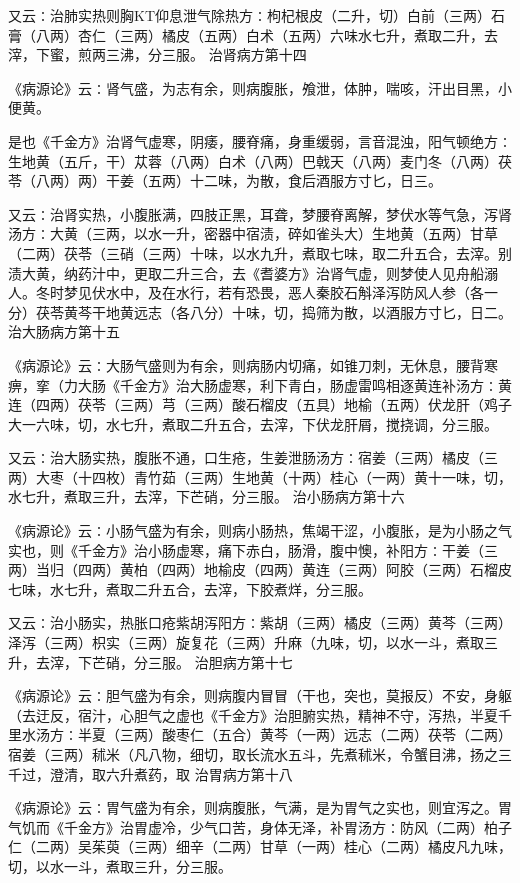 \documentclass[a4paper,12pt,UTF8,twoside]{ctexbook}
\begin{document}
又云∶治肺实热则胸KT仰息泄气除热方∶枸杞根皮（二升，切）白前（三两）石膏（八两）杏仁（三两）橘皮（五两）白术（五两）六味水七升，煮取二升，去滓，下蜜，煎两三沸，分三服。
治肾病方第十四

《病源论》云∶肾气盛，为志有余，则病腹胀，飧泄，体肿，喘咳，汗出目黑，小便黄。

是也《千金方》治肾气虚寒，阴痿，腰脊痛，身重缓弱，言音混浊，阳气顿绝方∶生地黄（五斤，干）苁蓉（八两）白术（八两）巴戟天（八两）麦门冬（八两）茯苓（八两）两）干姜（五两）十二味，为散，食后酒服方寸匕，日三。

又云∶治肾实热，小腹胀满，四肢正黑，耳聋，梦腰脊离解，梦伏水等气急，泻肾汤方∶大黄（三两，以水一升，密器中宿渍，碎如雀头大）生地黄（五两）甘草（二两）茯苓（三硝（三两）十味，以水九升，煮取七味，取二升五合，去滓。别渍大黄，纳药汁中，更取二升三合，去《耆婆方》治肾气虚，则梦使人见舟船溺人。冬时梦见伏水中，及在水行，若有恐畏，恶人秦胶石斛泽泻防风人参（各一分）茯苓黄芩干地黄远志（各八分）十味，切，捣筛为散，以酒服方寸匕，日二。
治大肠病方第十五

《病源论》云∶大肠气盛则为有余，则病肠内切痛，如锥刀刺，无休息，腰背寒痹，挛（力大肠《千金方》治大肠虚寒，利下青白，肠虚雷鸣相逐黄连补汤方∶黄连（四两）茯苓（三两）芎（三两）酸石榴皮（五具）地榆（五两）伏龙肝（鸡子大一六味，切，水七升，煮取二升五合，去滓，下伏龙肝屑，搅挠调，分三服。

又云∶治大肠实热，腹胀不通，口生疮，生姜泄肠汤方∶宿姜（三两）橘皮（三两）大枣（十四枚）青竹茹（三两）生地黄（十两）桂心（一两）黄十一味，切，水七升，煮取三升，去滓，下芒硝，分三服。
治小肠病方第十六

《病源论》云∶小肠气盛为有余，则病小肠热，焦竭干涩，小腹胀，是为小肠之气实也，则《千金方》治小肠虚寒，痛下赤白，肠滑，腹中懊，补阳方∶干姜（三两）当归（四两）黄柏（四两）地榆皮（四两）黄连（三两）阿胶（三两）石榴皮七味，水七升，煮取二升五合，去滓，下胶煮烊，分三服。

又云∶治小肠实，热胀口疮紫胡泻阳方∶紫胡（三两）橘皮（三两）黄芩（三两）泽泻（三两）枳实（三两）旋复花（三两）升麻（九味，切，以水一斗，煮取三升，去滓，下芒硝，分三服。
治胆病方第十七

《病源论》云∶胆气盛为有余，则病腹内冒冒（干也，突也，莫报反）不安，身躯（去迂反，宿汁，心胆气之虚也《千金方》治胆腑实热，精神不守，泻热，半夏千里水汤方∶半夏（三两）酸枣仁（五合）黄芩（一两）远志（二两）茯苓（二两）宿姜（三两）秫米（凡八物，细切，取长流水五斗，先煮秫米，令蟹目沸，扬之三千过，澄清，取六升煮药，取
治胃病方第十八

《病源论》云∶胃气盛为有余，则病腹胀，气满，是为胃气之实也，则宜泻之。胃气饥而《千金方》治胃虚冷，少气口苦，身体无泽，补胃汤方∶防风（二两）柏子仁（二两）吴茱萸（三两）细辛（二两）甘草（一两）桂心（二两）橘皮凡九味，切，以水一斗，煮取三升，分三服。
\end{document}

